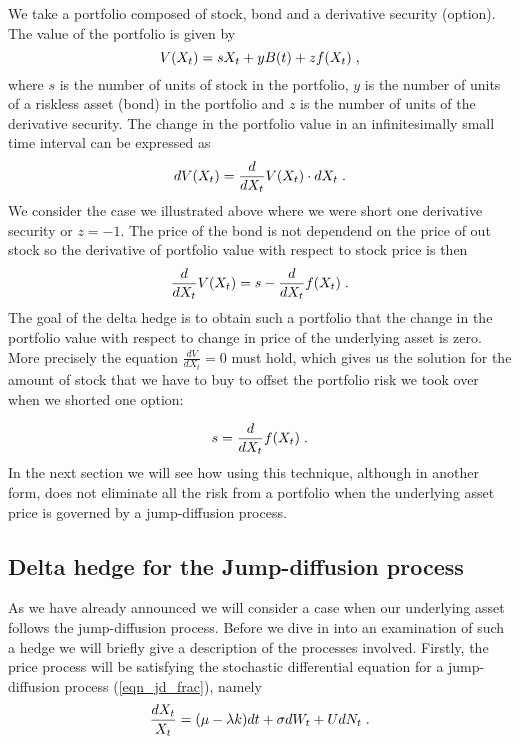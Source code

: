 \documentclass[times, utf8, diplomski]{fer}
\begin{document}
We take a portfolio composed of stock, bond and a derivative security (option). The value of the portfolio is given by
$$ V(X_t) = sX_t + yB(t) + zf(X_t) \hspace{0.1cm},$$
where $s$ is the number of units of stock in the portfolio, $y$ is the number of units of a riskless asset (bond) in the portfolio and $z$ is the number of units of the derivative security.
The change in the portfolio value in an infinitesimally small time interval can be expressed as
$$
	dV(X_t) = \frac{d}{dX_t}V(X_t) \cdot dX_t \hspace{0.1cm}.
$$ We consider the case we illustrated above where we were short one derivative security or $z=-1$. The price of the bond is not dependend on the price of out stock so the derivative of portfolio value with respect to stock price is then $$ \frac{d}{dX_t}V(X_t) = s - \frac{d}{dX_t}f(X_t) \hspace{0.1cm}.$$ The goal of the delta hedge is to obtain such a portfolio that the change in the portfolio value with respect to change in price of the underlying asset is zero. More precisely the equation $\frac{dV}{dX_t} = 0$ must hold, which gives us the solution for the amount of stock that we have to buy to offset the portfolio risk we took over when we shorted one option:

\begin{equation}
	s = \frac{d}{dX_t}f(X_t) \hspace{0.1cm}.
\end{equation} In the next section we will see how using this technique, although in another form, does not eliminate all the risk from a portfolio when the underlying asset price is governed by a jump-diffusion process. 

\subsection{Delta hedge for the Jump-diffusion process} \label{sec:delta_hedge_jd}
As we have already announced we will consider a case when our underlying asset follows the jump-diffusion process. Before we dive in into an examination of such a hedge we will briefly give a description of the processes involved. Firstly, the price process will be satisfying the stochastic differential equation for a jump-diffusion process (\ref{eqn_jd_frac}), namely
\begin{equation}\label{eqn_delta_hedge_x}
	\frac{dX_t}{X_t} = (\mu - \lambda k)dt + \sigma dW_t + UdN_t \hspace{0.1cm}.
\end{equation}
\end{document}
